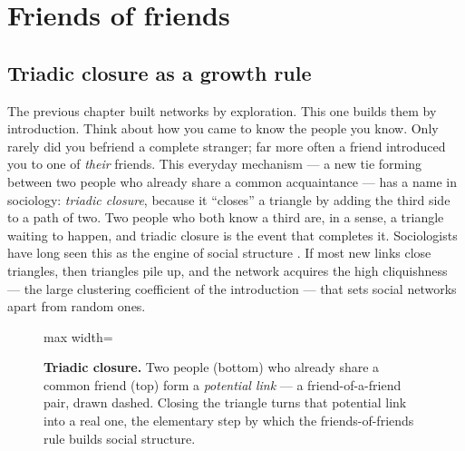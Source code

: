 \chapter{Friends of friends}
\label{ch:friends}

\section{Triadic closure as a growth rule}

The previous chapter built networks by exploration. This one builds them by
introduction. Think about how you came to know the people you know. Only rarely
did you befriend a complete stranger; far more often a friend introduced you to
one of \emph{their} friends. This everyday mechanism --- a new tie forming
between two people who already share a common acquaintance --- has a name in
sociology: \emph{triadic closure}, because it ``closes'' a triangle by adding
the third side to a path of two. Two people who both know a third are, in a
sense, a triangle waiting to happen, and triadic closure is the event that
completes it. Sociologists have long seen this as the engine of social structure
\citep{granovetter1973}. If most new links close triangles, then triangles pile
up, and the network acquires the high cliquishness --- the large clustering
coefficient of the introduction --- that sets social networks apart from random
ones.

\begin{figure}[t]
\centering
\begin{adjustbox}{max width=\linewidth}\end{adjustbox}
\caption{\textbf{Triadic closure.} Two people (bottom) who already share a common
friend (top) form a \emph{potential link} --- a friend-of-a-friend pair, drawn
dashed. Closing the triangle turns that potential link into a real one, the
elementary step by which the friends-of-friends rule builds social structure.}
\label{fig:fr-closure}
\end{figure}

